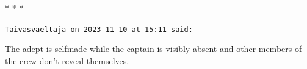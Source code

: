 
\begin{center}* * *\end{center}

\begin{footnotesize}
\begin{sffamily}

\texttt{Taivasvaeltaja on 2023-11-10 at 15:11 said:}

The adept is selfmade while the captain is visibly absent and other members of the crew don't reveal 
themselves.

\hfill

\end{sffamily}
\end{footnotesize}

